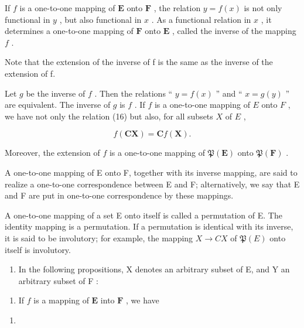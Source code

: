 If \(f\) is a one-to-one mapping of \(\mathbf{E}\) onto \(\mathbf{F}\) , the relation \(y = f(x)\) is not only functional in \(y\) , but also functional in \(x\) . As a functional relation in \(x\) , it determines a one-to-one mapping of \(\mathbf{F}\) onto \(\mathbf{E}\) , called the inverse of the mapping \(f\) .

Note that the extension of the inverse of f is the same as the inverse of the extension of f.

Let \(g\) be the inverse of \(f\) . Then the relations `` \(y = f(x)\) '' and `` \(x = g(y)\) '' are equivalent. The inverse of \(g\) is \(f\) . If \(f\) is a one-to-one mapping of \(E\) onto \(F\) , we have not only the relation (16) but also, for all subsets \(X\) of \(E\) ,

\[
f (\mathbf {C X}) = \mathbf {C} f (\mathbf {X}).
\]

Moreover, the extension of \(f\) is a one-to-one mapping of \(\mathfrak{P}(\mathbf{E})\) onto \(\mathfrak{P}(\mathbf{F})\) .

A one-to-one mapping of E onto F, together with its inverse mapping, are said to realize a one-to-one correspondence between E and F; alternatively, we say that E and F are put in one-to-one correspondence by these mappings.

A one-to-one mapping of a set E onto itself is called a permutation of E. The identity mapping is a permutation. If a permutation is identical with its inverse, it is said to be involutory; for example, the mapping \(X \rightarrow C X\) of \(\mathfrak{P}(E)\) onto itself is involutory.

\begin{enumerate}
\def\labelenumi{\arabic{enumi}.}
\setcounter{enumi}{9}
\tightlist
\item
  In the following propositions, X denotes an arbitrary subset of E, and Y an arbitrary subset of F :
\end{enumerate}

\begin{enumerate}
\def\labelenumi{(\alph{enumi})}
\tightlist
\item
  If \(f\) is a mapping of \(\mathbf{E}\) into \(\mathbf{F}\) , we have
\end{enumerate}

\begin{enumerate}
\def\labelenumi{(\arabic{enumi})}
\setcounter{enumi}{16}
\tightlist
\item
\end{enumerate}

